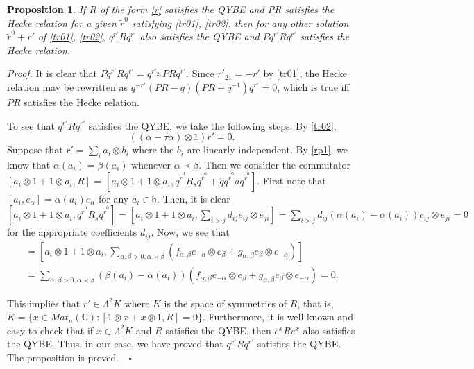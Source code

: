 \documentclass[12pt]{article}
\newtheorem{prop}{Proposition}[section]
\numberwithin{equation}{section}
\begin{document}
\begin{prop} 
If $R$ of the form \eqref{r} satisfies the QYBE and PR satisfies the
Hecke relation for a given $\tilde r^0$ satisfying \eqref{tr01},
\eqref{tr02}, then for any other solution $\tilde r^0 + r'$ of
\eqref{tr01}, \eqref{tr02}, $q^{r'} R q^{r'}$ also satisfies the QYBE
and $P q^{r'} R q^{r'}$ satisfies the Hecke relation.
\end{prop}

{\it Proof.}  It is clear that $P q^{r'} R q^{r'} = q^{r'_{21}} PR
q^{r'}$. Since $r'_{21} = -r'$ by \eqref{tr01}, the Hecke relation may
be rewritten as $q^{-r'} (PR - q) (PR + q^{-1}) q^{r'} = 0$, which is
true iff $PR$ satisfies the Hecke relation.

To see that $q^{r'} R q^{r'}$ satisfies the QYBE, we take the
following steps.  By \eqref{tr02},
\begin{equation} \label{rp1}
((\alpha - \tau \alpha) \otimes 1) r' = 0.
\end{equation}
Suppose that $r' = \sum_i a_i \otimes b_i$ where the $b_i$ are
linearly independent. By \eqref{rp1}, we know that $\alpha(a_i) =
\beta(a_i)$ whenever $\alpha \prec \beta$.  Then we consider the
commutator $[a_i \otimes 1 + 1 \otimes a_i, R]$ = $[a_i \otimes 1 + 1
\otimes a_i, q^{\tilde r^0}R_s q^{\tilde r^0} + \hat q q^{\tilde r^0}
\tilde a q^{\tilde r^0}]$.  First note that $[a_i, e_{\alpha}] =
\alpha(a_i) e_\alpha$ for any $a_i \in \mathfrak h$.  Then, it is
clear $[a_i \otimes 1 + 1 \otimes a_i, q^{\tilde r^0} R_s q^{\tilde
r^0}] = [a_i \otimes 1 + 1 \otimes a_i, \sum_{i > j} d_{ij} e_{ij}
\otimes e_{ji}] = \sum_{i > j} d_{ij} (\alpha(a_i)-\alpha(a_i)) e_{ij}
\otimes e_{ji} = 0$ for the appropriate coefficients $d_{ij}$.  Now,
we see that
\begin{multline*}
[a_i \otimes 1 + 1\otimes a_i, q^{\tilde r^0} \tilde a q^{\tilde r^0}]
= [a_i \otimes 1 + 1 \otimes a_i, \sum_{\alpha, \beta > 0, \alpha
\prec \beta} (f_{\alpha,\beta} e_{-\alpha} \otimes e_{\beta} +
g_{\alpha, \beta} e_{\beta} \otimes e_{-\alpha})] \\ = \sum_{\alpha,
\beta > 0, \alpha \prec \beta} (\beta(a_i) - \alpha(a_i))
(f_{\alpha,\beta} e_{-\alpha} \otimes e_{\beta} + g_{\alpha, \beta}
e_{\beta} \otimes e_{-\alpha}) = 0.
\end{multline*}

This implies that $r' \in \Lambda^2 K$ where $K$ is the space of
symmetries of $R$, that is, $K = \{ x \in Mat_{n}(\mathbb C): [1
\otimes x + x \otimes 1, R] = 0\}$.  Furthermore, it is well-known and
easy to check that if $x \in \Lambda^2 K$ and $R$ satisfies the QYBE,
then $e^x R e^x$ also satisfies the QYBE.  Thus, in our case, we have
proved that $q^{r'} R q^{r'}$ satisfies the QYBE.  The proposition is
proved.$\quad\square$
\end{document}
